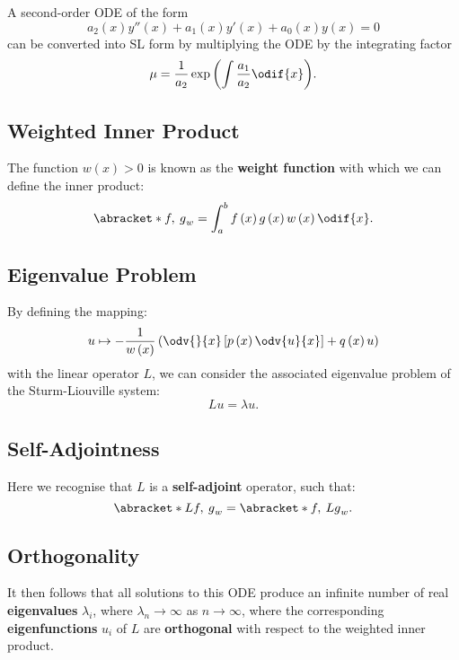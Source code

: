 \documentclass{article}
\begin{document}
A second-order ODE of the form
\begin{equation*}
    a_2\left( x \right) y''\left( x \right) + a_1\left( x \right) y'\left( x \right) + a_0\left( x \right) y\left( x \right) = 0
\end{equation*}
can be converted into SL form by multiplying the ODE by the integrating factor
\begin{equation*}
    \mu = \frac{1}{a_2} \exp{\left( \int \frac{a_1}{a_2} \odif{x} \right)}.
\end{equation*}
\subsection{Weighted Inner Product}
The function \(w\left( x \right) > 0\) is known as the \textbf{weight function} with which we can define the inner product:
\begin{equation*}
    \abracket*{f,\: g}_{w} = \int_a^b f\left( x \right) g\left( x \right) w\left( x \right) \odif{x}.
\end{equation*}
\subsection{Eigenvalue Problem}
By defining the mapping:
\begin{equation*}
    u \mapsto - \frac{1}{w\left( x \right)} \left( \odv{}{x} \left[ p\left( x \right) \odv{u}{x} \right] + q\left( x \right) u \right)
\end{equation*}
with the linear operator \(L\), we can consider the associated eigenvalue problem of
the Sturm-Liouville system:
\begin{equation*}
    L u = \lambda u.
\end{equation*}
\subsection{Self-Adjointness}
Here we recognise that \(L\) is a \textbf{self-adjoint} operator, such that:
\begin{equation*}
    \abracket*{Lf,\: g}_{w} = \abracket*{f,\: Lg}_{w}.
\end{equation*}
\subsection{Orthogonality}
It then follows that all solutions to this ODE produce an infinite number of real \textbf{eigenvalues} \(\lambda_i\),
where \(\lambda_n \to \infty\) as \(n \to \infty\), where the corresponding \textbf{eigenfunctions} \(u_i\) of \(L\)
are \textbf{orthogonal} with respect to the weighted inner product.
\end{document}
